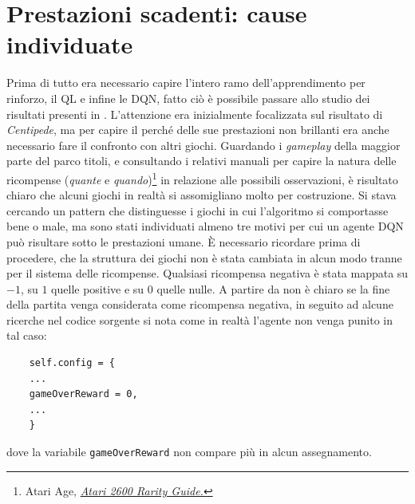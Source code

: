 \documentclass[twoside,twocolumn,10pt]{extarticle}
\theoremstyle{definition}
\begin{document}
%		
		
\section{Prestazioni scadenti: cause individuate}\label{sec:no}
	Prima di tutto era necessario capire l'intero ramo dell'apprendimento per rinforzo, il QL e infine le DQN, fatto ciò è possibile passare allo studio dei risultati presenti in \cite{bib:dqn}. L'attenzione era inizialmente focalizzata sul risultato di \textit{Centipede}, ma per capire il perché delle sue prestazioni non brillanti era anche necessario fare il confronto con altri giochi. Guardando i \textit{gameplay} della maggior parte del parco titoli, e consultando i relativi manuali per capire la natura delle ricompense (\textit{quante} e \textit{quando})\footnote{Atari Age, \emph{\href{https://atariage.com/software_search.php?SystemID=2600}{Atari 2600 Rarity Guide.}}} in relazione alle possibili osservazioni, è risultato chiaro che alcuni giochi in realtà si assomigliano molto per costruzione. Si stava cercando un pattern che distinguesse i giochi in cui l'algoritmo si comportasse bene o male, ma sono stati individuati almeno tre motivi per cui un agente DQN può risultare sotto le prestazioni umane. È necessario ricordare prima di procedere, che la struttura dei giochi non è stata cambiata in alcun modo tranne per il sistema delle ricompense. Qualsiasi ricompensa negativa è stata mappata su $-1$, su $1$ quelle positive e su $0$ quelle nulle. A partire da \cite{bib:dqn} non è chiaro se la fine della partita venga considerata come ricompensa negativa, in seguito ad alcune ricerche nel codice sorgente si nota come in realtà l'agente non venga punito in tal caso:
	\begin{verbatim}
	self.config = {
	...
	gameOverReward = 0,
	...
	}
	\end{verbatim}
	dove la variabile \texttt{gameOverReward} non compare più in alcun assegnamento.
\end{document}
